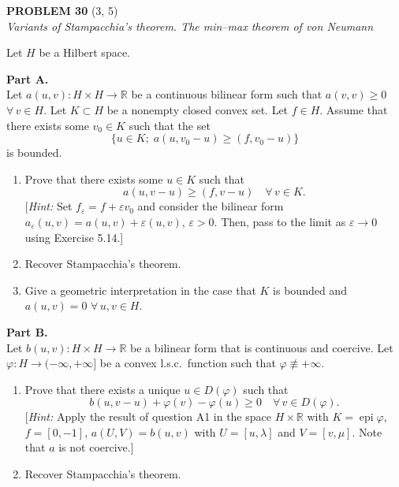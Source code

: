 \documentclass[12pt]{article}
\newcommand{\R}{\mathbb{R}}
\begin{document}
\bigskip
 
\noindent\textbf{PROBLEM 30} (3, 5)\\[4pt]
\textit{Variants of Stampacchia's theorem. The min--max theorem of von Neumann}
 
\medskip
 
Let $H$ be a Hilbert space.
 
\medskip
 
\noindent\textbf{Part A.}\\
Let $a(u,v) : H \times H \to \R$ be a continuous bilinear form such that
$a(v,v) \ge 0$ $\forall\, v \in H$.
Let $K \subset H$ be a nonempty closed convex set. Let $f \in H$. Assume that there
exists some $v_0 \in K$ such that the set
\[
\{u \in K;\; a(u, v_0 - u) \ge (f, v_0 - u)\}
\]
is bounded.
 
\begin{enumerate}
\item Prove that there exists some $u \in K$ such that
\[
a(u, v-u) \ge (f, v-u) \quad \forall\, v \in K.
\]
[\textit{Hint:} Set $f_\varepsilon = f + \varepsilon v_0$ and consider the bilinear form
$a_\varepsilon(u,v) = a(u,v) + \varepsilon(u,v)$, $\varepsilon > 0$. Then, pass to the limit as $\varepsilon \to 0$ using
Exercise 5.14.]
 
\item Recover Stampacchia's theorem.
 
\item Give a geometric interpretation in the case that $K$ is bounded and $a(u,v) = 0$
$\forall\, u, v \in H$.
\end{enumerate}
 
\noindent\textbf{Part B.}\\
Let $b(u,v) : H \times H \to \R$ be a bilinear form that is continuous and coercive.
Let $\varphi : H \to (-\infty,+\infty]$ be a convex l.s.c.\ function such that $\varphi \not\equiv +\infty$.
 
\begin{enumerate}
\item Prove that there exists a unique $u \in D(\varphi)$ such that
\[
b(u, v-u) + \varphi(v) - \varphi(u) \ge 0 \quad \forall\, v \in D(\varphi).
\]
[\textit{Hint:} Apply the result of question A1 in the space $H \times \R$ with $K = \operatorname{epi}\varphi$,
$f = [0,-1]$, $a(U,V) = b(u,v)$ with $U = [u,\lambda]$ and $V = [v,\mu]$. Note that $a$
is not coercive.]
 
\item Recover Stampacchia's theorem.
\end{enumerate}
 
\end{document}
